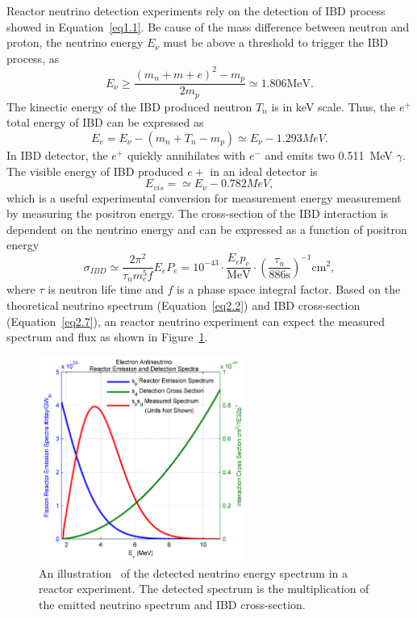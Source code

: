     Reactor neutrino detection experiments rely on the detection of IBD process showed in Equation~\ref{eq1.1}.
    Be cause of the mass difference between neutron and proton, the neutrino energy $E_\nu$ must be above a threshold to trigger the IBD process, as
    \begin{equation}\label{eq2.4}
    E_\nu \ge \frac{(m_n+m+e)^2 - m_p}{2m_p} \simeq 1.806 \textrm{MeV}.
    \end{equation}
    The kinectic energy of the IBD produced neutron $T_n$ is in keV scale.
    Thus, the $e^+$ total energy of IBD can be expressed as
    \begin{equation}\label{eq2.5}
    E_e = E_\nu - (m_n + T_n - m_p) \simeq E_\nu - 1.293 MeV.
    \end{equation}
    In IBD detector, the $e^+$ quickly annihilates with $e^-$ and emits two 0.511~MeV $\gamma$.
    The visible energy of IBD produced $e+$ in an ideal detector is 
    \begin{equation}\label{eq2.6}
    E_{vis} = \simeq E_\nu - 0.782 MeV,
    \end{equation}
    which is a useful experimental conversion for measurement \nuebar energy measurement by measuring the positron energy. 
    The cross-section of the IBD interaction is dependent on the neutrino energy and can be expressed as a function of positron energy
    \begin{equation}\label{eq2.7}
    \sigma_{IBD} \simeq \frac{2\pi^2}{\tau_n m_e^5 f }E_eP_e = 10^{-43}\cdot \frac{E_ep_e}{\textrm{MeV}}\cdot(\frac{\tau_n}{886\textrm{s}})^{-1} \textrm{cm}^2,
    \end{equation} 
    where $\tau$ is neutron life time and $f$ is a phase space integral factor.
    Based on the theoretical neutrino spectrum (Equation~\ref{eq2.2}) and IBD cross-section (Equation~\ref{eq2.7}), an reactor neutrino experiment can expect the measured spectrum and flux as shown in Figure~\ref{fig:2.2}.
    \begin{figure}[h!]
    \centering
    \includegraphics[width=0.6\textwidth]{Figures/twoXsections.png}
    \caption[Detected neutrino spectrum]{An illustration~\cite{bib:Jocher} of the detected neutrino energy spectrum in a reactor experiment. 
    The detected spectrum is the multiplication of the emitted neutrino spectrum and IBD cross-section.}
    \label{fig:2.2}
    \end{figure}      
    

